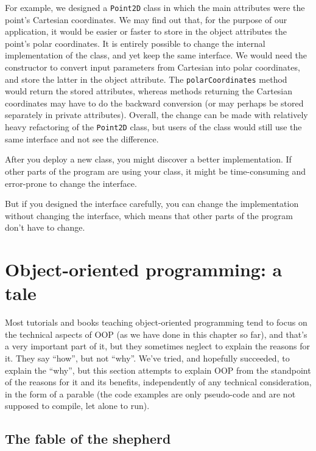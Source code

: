For example, we designed a {\tt Point2D} class in which the main 
attributes were the point's Cartesian coordinates. We may find 
out that, for the purpose of our application, it would be easier 
or faster to store in the object attributes the point's polar 
coordinates. It is entirely possible to change the internal 
implementation of the class, and yet keep the same interface. 
We would need the constructor to convert input parameters from 
Cartesian into polar coordinates, and store the latter in the 
object attribute. The {\tt polarCoordinates} method would 
return the stored attributes, whereas methods returning the 
Cartesian coordinates may have to do the backward conversion 
(or may perhaps be stored separately in private attributes). 
Overall, the change can be made with relatively heavy refactoring 
of the {\tt Point2D} class, but users of the class would still 
use the same interface and not see the difference.

After you deploy a new class, you might discover a better
implementation.  If other parts of the program are using your
class, it might be time-consuming and error-prone to change the
interface.  

But if you designed the interface carefully, you can
change the implementation without changing the interface, which
means that other parts of the program don't have to change.


\section{Object-oriented programming: a tale}

Most tutorials and books teaching object-oriented 
programming tend to focus on the technical aspects 
of OOP (as we have done in this chapter so far), and 
that's a very important part of it, but they sometimes 
neglect to explain the reasons for it. They say ``how'', 
but not ``why''. We've tried, and hopefully succeeded, to 
explain the ``why'', but this section attempts to 
explain OOP from the standpoint of the reasons for it 
and its benefits, independently of any technical 
consideration, in the form of a parable (the code 
examples are only pseudo-code and are not supposed 
to compile, let alone to run). 

\subsection{The fable of the shepherd} 

